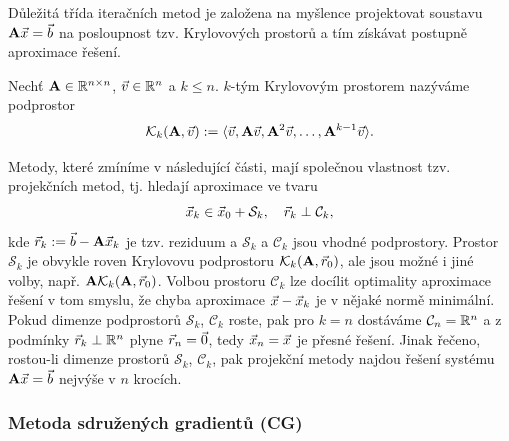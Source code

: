 Důležitá třída iteračních metod je založena na myšlence projektovat soustavu $\mathbf{A}\vec{x}=\vec{b}$ na posloupnost tzv. Krylovových prostorů a tím získávat postupně aproximace řešení.
\begin{df}
Nechť $\mathbf{A}\in\mathbb R^{n\times n}$, $\vec{v}\in\mathbb R^n$ a $k\le n$.
$k$-tým Krylovovým prostorem nazýváme podprostor
$$ \mathcal K_k(\mathbf{A},\vec{v}):=\langle \vec{v},\mathbf{A}\vec{v},\mathbf{A}^2\vec{v},\ldots,\mathbf{A}^{k-1}\vec{v}\rangle. $$
\end{df}
Metody, které zmíníme v následující části, mají společnou vlastnost tzv. projekčních metod, tj. hledají aproximace ve tvaru
$$ \vec{x}_k\in \vec{x}_0 + \mathcal S_k, \quad \vec{r}_k\perp\mathcal C_k, $$
kde $\vec{r}_k:=\vec{b}-\mathbf{A}\vec{x}_k$ je tzv. reziduum a $\mathcal S_k$ a $\mathcal C_k$ jsou vhodné podprostory.
Prostor $\mathcal S_k$ je obvykle roven Krylovovu podprostoru $\mathcal K_k(\mathbf{A},\vec{r}_0)$, ale jsou možné i jiné volby, např. $\mathbf{A}\mathcal K_k(\mathbf{A},\vec{r}_0)$.
Volbou prostoru $\mathcal C_k$ lze docílit optimality aproximace řešení v tom smyslu, že chyba aproximace $\vec{x}-\vec{x}_k$ je v nějaké normě minimální.
Pokud dimenze podprostorů $\mathcal S_k$, $\mathcal C_k$ roste, pak pro $k=n$ dostáváme $\mathcal C_n=\mathbb R^n$ a z podmínky $\vec{r}_k\perp\mathcal{\mathbb R}^n$ plyne $\vec{r}_n=\vec{0}$, tedy $\vec{x}_n=\vec{x}$ je přesné řešení.
Jinak řečeno, rostou-li dimenze prostorů $\mathcal S_k$, $\mathcal C_k$, pak projekční metody najdou řešení systému $\mathbf{A}\vec{x}=\vec{b}$ nejvýše v $n$ krocích.


\subsubsection{Metoda sdružených gradientů (CG)}
\label{sec:cg}

